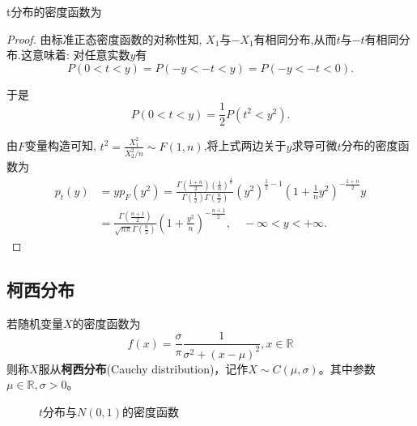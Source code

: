 \begin{proposition}
    t分布的密度函数为
\end{proposition}

\begin{proof}
    由标准正态密度函数的对称性知, $X_1$与$-X_1$有相同分布,从而$t$与$-t$有相同分布.这意味着: 对任意实数$y$有
    \[P(0<t<y)=P(-y<-t<y)=P(-y<-t<0).\]

    于是
    \[P(0<t<y)=\frac12P(t^2<y^2).\]

    由$F$变量构造可知, $t^2=\frac{X_1^2}{X_2^2/n}\sim F(1,n)$,将上式两边关于$y$求导可微$t$分布的密度函数为
    \begin{align*}
        p_t(y) & =yp_F(y^2)=\frac{\Gamma \left( \frac{1+n}{2} \right) \left( \frac{1}{n} \right) ^{\frac{1}{n}}}{\Gamma \left( \frac{1}{2} \right) \Gamma \left( \frac{n}{2} \right)}\left( y^2 \right) ^{\frac{1}{2}-1}\left( 1+\frac{1}{n}y^2 \right) ^{-\frac{1+n}{2}}y \\
               & =\frac{\Gamma \left( \frac{n+1}{2} \right)}{\sqrt{n\pi}\Gamma \left( \frac{n}{2} \right)}\left( 1+\frac{y^2}{n} \right) ^{-\frac{n+1}{2}},\quad -\infty<y<+\infty.
    \end{align*}
\end{proof}

\subsection{柯西分布}

\begin{definition}
    若随机变量$X$的密度函数为
    \[ f(x) = \frac{\sigma}{\pi} \frac1{\sigma^2+(x-\mu)^2} ,x \in \mathbb{R} \]
    则称$X$服从\textbf{柯西分布}(Cauchy distribution)，记作$X\sim C(\mu,\sigma)$。其中参数$\mu \in \mathbb{R},\sigma>0$。
\end{definition}

\begin{figure}
    \centering
    \caption{$t$分布与$N(0,1)$的密度函数}
\end{figure}

